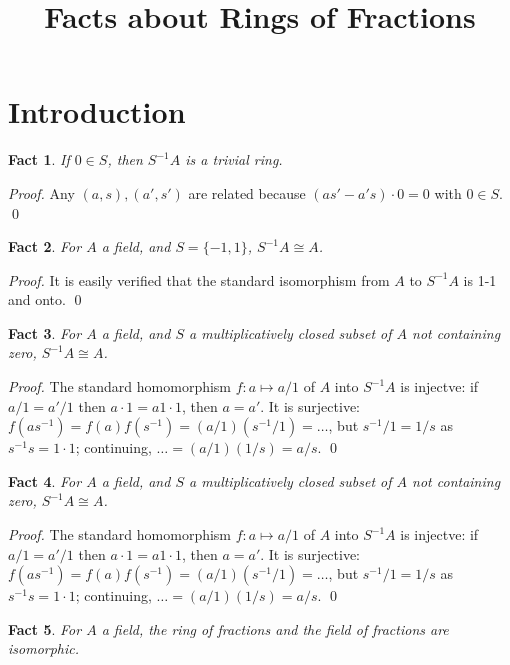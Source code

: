 \documentclass{article}
\title{Facts about Rings of Fractions}
\date{}
\newtheorem{theorem}{Fact}[section]
\begin{document}
 

\maketitle

\section{Introduction}

\begin{theorem}
If $0 \in S$, then $S^{-1}A$ is a trivial ring.
\end{theorem}

\noindent
\textit{Proof.} Any $(a, s), (a', s')$ are related because $(as' - a's) \cdot 0 = 0$ with $0 \in S$. \qed


\vspace{2em}

\begin{theorem}
For $A$ a field, and $S = \{-1, 1\}$, $S^{-1}A \cong A$.
\end{theorem}

\noindent
\textit{Proof.} It is easily verified that the standard isomorphism from $A$ to $S^{-1}A$ is 1-1 and onto. \qed

\begin{theorem}
For $A$ a field, and $S$ a multiplicatively closed subset of $A$ not containing zero, $S^{-1}A \cong A$.
\end{theorem}

\noindent
\textit{Proof.} The standard homomorphism $f:a \mapsto a/1$ of $A$ into $S^{-1}A$ is injectve: if $a/1 = a'/1$ then $a \cdot 1 = a1 \cdot 1$, then $a = a'$. It is surjective: $f(as^{-1}) = f(a)f(s^{-1}) = (a/1)(s^{-1}/1) = \ldots$, but $s^{-1}/1 = 1/s$ as $s^{-1}s = 1 \cdot 1$; continuing, $\ldots = (a/1)(1/s) = a/s$. \qed

\begin{theorem}
For $A$ a field, and $S$ a multiplicatively closed subset of $A$ not containing zero, $S^{-1}A \cong A$.
\end{theorem}

\noindent
\textit{Proof.} The standard homomorphism $f:a \mapsto a/1$ of $A$ into $S^{-1}A$ is injectve: if $a/1 = a'/1$ then $a \cdot 1 = a1 \cdot 1$, then $a = a'$. It is surjective: $f(as^{-1}) = f(a)f(s^{-1}) = (a/1)(s^{-1}/1) = \ldots$, but $s^{-1}/1 = 1/s$ as $s^{-1}s = 1 \cdot 1$; continuing, $\ldots = (a/1)(1/s) = a/s$. \qed

\begin{theorem}
For $A$ a field, the ring of fractions and the field of fractions are isomorphic.
\end{theorem}
\end{document}
